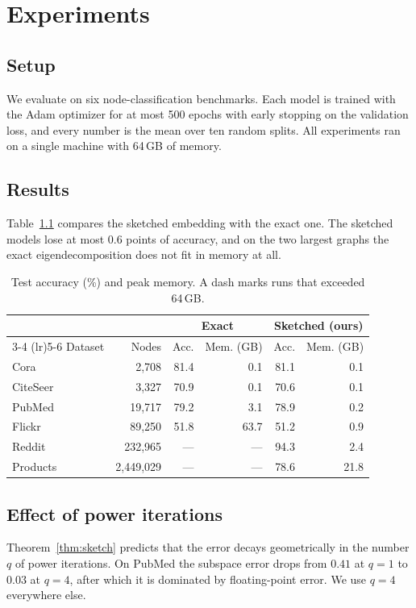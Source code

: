 \chapter{Experiments}
\label{ch:experiments}

\section{Setup}

We evaluate on six node-classification benchmarks. Each model is trained with the Adam optimizer for at most 500 epochs with early stopping on the validation loss, and every number is the mean over ten random splits. All experiments ran on a single machine with 64\,GB of memory.

\section{Results}

Table~\ref{tab:accuracy} compares the sketched embedding with the exact one. The sketched models lose at most 0.6 points of accuracy, and on the two largest graphs the exact eigendecomposition does not fit in memory at all.

\begin{table}[ht]
  \centering
  \caption{Test accuracy (\%) and peak memory. A dash marks runs that exceeded 64\,GB.}
  \label{tab:accuracy}
  \begin{tabular}{lrrrrr}
    \toprule
    & & \multicolumn{2}{c}{Exact} & \multicolumn{2}{c}{Sketched (ours)} \\
    \cmidrule(lr){3-4} \cmidrule(lr){5-6}
    Dataset & Nodes & Acc. & Mem. (GB) & Acc. & Mem. (GB) \\
    \midrule
    Cora & 2{,}708 & 81.4 & 0.1 & 81.1 & 0.1 \\
    CiteSeer & 3{,}327 & 70.9 & 0.1 & 70.6 & 0.1 \\
    PubMed & 19{,}717 & 79.2 & 3.1 & 78.9 & 0.2 \\
    Flickr & 89{,}250 & 51.8 & 63.7 & 51.2 & 0.9 \\
    Reddit & 232{,}965 & --- & --- & 94.3 & 2.4 \\
    Products & 2{,}449{,}029 & --- & --- & 78.6 & 21.8 \\
    \bottomrule
  \end{tabular}
\end{table}

\section{Effect of power iterations}

Theorem~\ref{thm:sketch} predicts that the error decays geometrically in the number $q$ of power iterations. On PubMed the subspace error drops from $0.41$ at $q = 1$ to $0.03$ at $q = 4$, after which it is dominated by floating-point error. We use $q = 4$ everywhere else.
